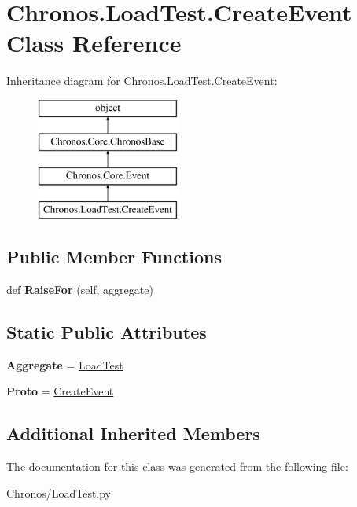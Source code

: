 \hypertarget{classChronos_1_1LoadTest_1_1CreateEvent}{}\section{Chronos.\+Load\+Test.\+Create\+Event Class Reference}
\label{classChronos_1_1LoadTest_1_1CreateEvent}
Inheritance diagram for Chronos.\+Load\+Test.\+Create\+Event\+:\begin{figure}[H]
\begin{center}
\leavevmode
\includegraphics[height=4.000000cm]{classChronos_1_1LoadTest_1_1CreateEvent}
\end{center}
\end{figure}
\subsection*{Public Member Functions}
\begin{DoxyCompactItemize}
\item 
def {\bfseries Raise\+For} (self, aggregate)\hypertarget{classChronos_1_1LoadTest_1_1CreateEvent_adf68a674bddead7886396936ce69afc5}{}\label{classChronos_1_1LoadTest_1_1CreateEvent_adf68a674bddead7886396936ce69afc5}

\end{DoxyCompactItemize}
\subsection*{Static Public Attributes}
\begin{DoxyCompactItemize}
\item 
{\bfseries Aggregate} = \hyperlink{classChronos_1_1LoadTest_1_1LoadTest}{Load\+Test}\hypertarget{classChronos_1_1LoadTest_1_1CreateEvent_a6cb1950ee5c4679aae02873c537e7025}{}\label{classChronos_1_1LoadTest_1_1CreateEvent_a6cb1950ee5c4679aae02873c537e7025}

\item 
{\bfseries Proto} = \hyperlink{classChronos_1_1LoadTest_1_1CreateEvent}{Create\+Event}\hypertarget{classChronos_1_1LoadTest_1_1CreateEvent_af6bfa7b9ef06053fe22c95522ae91e59}{}\label{classChronos_1_1LoadTest_1_1CreateEvent_af6bfa7b9ef06053fe22c95522ae91e59}

\end{DoxyCompactItemize}
\subsection*{Additional Inherited Members}


The documentation for this class was generated from the following file\+:\begin{DoxyCompactItemize}
\item 
Chronos/Load\+Test.\+py\end{DoxyCompactItemize}
